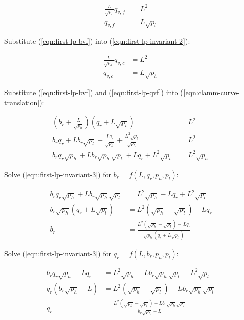 \documentclass[table, twocolumn]{article}
\begin{document}
\begin{align} \label{eqn:first-lp-qvf}
  \frac{L}{\sqrt{p_l}} q_{v, f} & = L^2 \nonumber \\
  q_{v, f}                      & = L \sqrt{p_l}
\end{align}

Substitute (\ref{eqn:first-lp-bvf}) into (\ref{eqn:first-lp-invariant-2}):

\begin{align}
  \frac{L}{\sqrt{p_h}} q_{v, c} & = L^2 \nonumber \\
  q_{v, c}                      & = L \sqrt{p_h}
\end{align}

Substitute (\ref{eqn:first-lp-bvf}) and (\ref{eqn:first-lp-qvf}) into
(\ref{eqn:clamm-curve-translation}):

\begin{align} \label{eqn:first-lp-invariant-3}
  (b_r + \frac{L}{\sqrt{p_h}})(q_r + L \sqrt{p_l})
   & = L^2 \nonumber  \\
  b_r q_r + L b_r \sqrt{p_l} + \frac{L q_r}{\sqrt{p_h}} +
  \frac{L^2 \sqrt{p_l}}{\sqrt{p_h}}
   & = L^2 \nonumber  \\
  b_r q_r \sqrt{p_h} + L b_r \sqrt{p_h} \sqrt{p_l} + L q_r + L^2 \sqrt{p_l}
   & = L^2 \sqrt{p_h}
\end{align}

Solve (\ref{eqn:first-lp-invariant-3}) for $b_r = f(L, q_r, p_h, p_l)$:

\begin{align}
  b_r q_r \sqrt{p_h} + L b_r \sqrt{p_h} \sqrt{p_l} & =
  L^2 \sqrt{p_h} - L q_r + L^2 \sqrt{p_l} \nonumber    \\
  b_r \sqrt{p_h} (q_r + L \sqrt{p_l})              & =
  L^2 (\sqrt{p_h} - \sqrt{p_l}) - L q_r \nonumber      \\
  b_r                                              & =
  \frac{L^2 (\sqrt{p_h} - \sqrt{p_l}) - L q_r}{\sqrt{p_h}(q_r + L \sqrt{p_l})}
\end{align}

Solve (\ref{eqn:first-lp-invariant-3}) for $q_r = f(L, b_r, p_h, p_l)$:

\begin{align}
  b_r q_r \sqrt{p_h} + L q_r & =
  L^2 \sqrt{p_h} - L b_r \sqrt{p_h} \sqrt{p_l} - L^2 \sqrt{p_l} \nonumber \\
  q_r (b_r \sqrt{p_h} + L)   & =
  L^2 (\sqrt{p_h} - \sqrt{p_l}) - L b_r \sqrt{p_h} \sqrt{p_l} \nonumber   \\
  q_r                        & =
  \frac{L^2 (\sqrt{p_h} - \sqrt{p_l}) - L b_r \sqrt{p_h} \sqrt{p_l}}
  {b_r \sqrt{p_h} + L}
\end{align}
\end{document}
